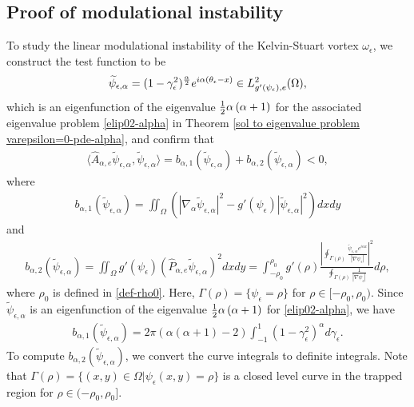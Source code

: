 \documentclass[1 [leqno, 11pt]{amsart}
\numberwithin{equation}{section}
\let\ep=\epsilon
\begin{document}
\begin{CJK*}{GBK}{song}
\subsection{Proof of modulational instability}
 To study the linear modulational instability of the Kelvin-Stuart vortex $\omega_\ep$, we construct the test function to be
  \begin{align}\label{test-function-modulational-instability}\widetilde\psi_{\ep,\alpha} =(1-\gamma_\ep^2)^{\alpha\over2}e^{i\alpha(\theta_\ep-x)}\in L^2_{{g'(\psi_\ep)},e}(\Omega),
   \end{align}
 which is an eigenfunction of the eigenvalue ${1\over2}\alpha\left( \alpha+1\right)$ for the associated eigenvalue problem \eqref{elip02-alpha} in Theorem \ref{sol to eigenvalue problem varepsilon=0-pde-alpha}, and confirm that
 \begin{align*}
\langle\hat{A}_{\alpha,e} \widetilde\psi_{\ep,\alpha}, \widetilde\psi_{\ep,\alpha} \rangle=  b_{\alpha, 1}(\widetilde\psi_{\ep,\alpha}) + b_{\alpha, 2}(\widetilde\psi_{\ep,\alpha}) < 0,
\end{align*}
where
\begin{align}\label{func-b1-alpha}
  b_{\alpha, 1}(\widetilde\psi_{\ep,\alpha}) = \iint_{\Omega} \left(|\nabla_\alpha \widetilde\psi_{\ep,\alpha}|^2  - g'(\psi_\ep) |\widetilde\psi_{\ep,\alpha}|^2 \right)dxdy
\end{align}
and
\begin{align}\label{func-b2-alpha}
 b_{\alpha, 2}(\widetilde\psi_{\ep,\alpha}) =  \iint_{\Omega} g'(\psi_\ep)( \hat{P}_{\alpha,e}\widetilde\psi_{\ep,\alpha})^2 dxdy =  \int_{-\rho_0}^{\rho_0} g'(\rho) \frac{\left|\oint_{\Gamma (\rho)} \frac{\widetilde\psi_{\ep,\alpha} e^{i \alpha x}}{|\nabla \psi_\ep|}\right|^2}{\oint_{\Gamma (\rho)} \frac{1}{|\nabla \psi_\ep|}} d\rho,
 \end{align}
 where $\rho_0 $ is defined in \eqref{def-rho0}.
Here,  $\Gamma (\rho)=\{\psi_\ep=\rho\}$ for $\rho\in[-\rho_0,\rho_0)$. Since $\widetilde\psi_{\ep,\alpha} $ is an eigenfunction of the eigenvalue ${1\over2}\alpha\left( \alpha+1\right)$ for \eqref{elip02-alpha}, we have
\begin{align}\label{func-b1-alpha-2}
  b_{\alpha, 1}(\widetilde\psi_{\ep,\alpha}) = 2\pi(\alpha(\alpha+1)-2)\int_{-1}^1(1-\gamma_\ep^2)^\alpha d\gamma_\ep.
\end{align}
To compute $ b_{\alpha, 2}(\widetilde\psi_{\ep,\alpha})$, we  convert the curve integrals to  definite integrals.
Note that $\Gamma(\rho) = \{(x, y) \in \Omega| \psi_\ep(x,y) = \rho\} $ is a closed level curve in the trapped region for $\rho\in(-\rho_0, \rho_0]$.

\end{CJK*}
\end{document}
